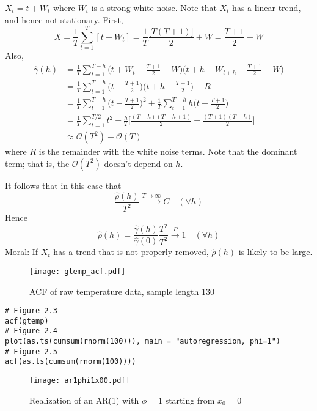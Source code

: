 \begin{Example}{}{}
    $ X_t=t+W_t $ where $ W_t $ is a strong white noise. Note that
    $ X_t $ has a linear trend, and hence not stationary.
    First,
    \[ \bar{X}=\frac{1}{T} \sum_{t=1}^{T}[t+W_t]=\frac{1}{T}
        \frac{\bigl[T(T+1)\bigr]}{2}+\bar{W}=\frac{T+1}{2} +\bar{W}  \]
    Also,
    \begin{align*}
        \hat{\gamma}(h)
         & =\frac{1}{T} \sum_{t=1}^{T-h}\biggl(t+W_t-\frac{T+1}{2} -\bar{W}\biggr)\biggl(t+h+W_{t+h}-\frac{T+1}{2}-\bar{W}\biggr)        \\
         & =\frac{1}{T} \sum_{t=1}^{T-h}\biggl(t-\frac{T+1}{2}\biggr)\biggl(t+h-\frac{T+1}{2}\biggr)+R                                   \\
         & =\frac{1}{T} \sum_{t=1}^{T-h} \biggl(t-\frac{T+1}{2}\biggr)^{\!2}+\frac{1}{T} \sum_{t=1}^{T-h} h\biggl(t-\frac{T+1}{2}\biggr) \\
         & =\frac{1}{T} \sum_{t=1}^{T/2} t^2+\frac{h}{T} \biggl[\frac{(T-h)(T-h+1)}{2}-\frac{(T+1)(T-h)}{2} \biggr]                      \\
         & \approx \mathcal{O}(T^2)+\mathcal{O}(T)
    \end{align*}
    where $ R $ is the remainder with the white noise terms. Note that
    the dominant term; that is, the $ \mathcal{O}(T^2) $ doesn't depend on $ h $.

    It follows that in this case that
    \[ \frac{\hat{\rho}(h)}{T^2}\xrightarrow{T\to\infty} C\quad(\forall h)  \]
    Hence
    \[ \hat{\rho}(h)=\frac{\hat{\gamma}(h)}{\hat{\gamma}(0)}\frac{T^2}{T^2}\stackrel{P}{\to}1\quad(\forall h)  \]
    \underline{Moral}: If $ X_t $ has a trend that is not properly removed,
    $ \hat{\rho}(h) $ is likely to be large.
\end{Example}
\begin{figure}[!htbp]
    \centering
    \texttt{[image: gtemp\_acf.pdf]}
    \caption{ACF of raw temperature data, sample length 130}\label{fig:gtemp_acf}
\end{figure}
\begin{verbatim}
# Figure 2.3
acf(gtemp)
# Figure 2.4
plot(as.ts(cumsum(rnorm(100))), main = "autoregression, phi=1")
# Figure 2.5
acf(as.ts(cumsum(rnorm(100))))
\end{verbatim}
\begin{figure}[!htbp]
    \centering
    \texttt{[image: ar1phi1x00.pdf]}
    \caption{Realization of an AR(1) with $ \phi=1 $ starting from
        $ x_0=0 $}\label{fig:ar1phi1x00}
\end{figure}
